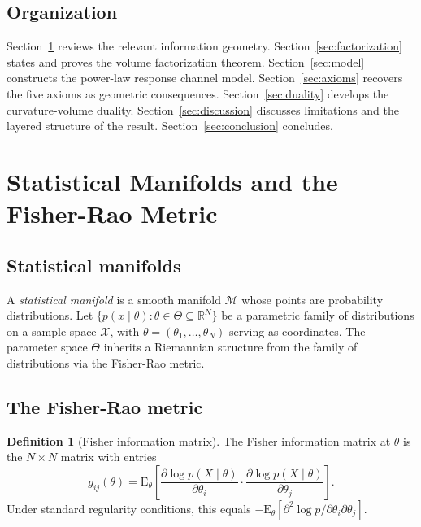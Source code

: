 \documentclass[12pt, a4paper]{article}
\newcommand{\R}{\mathbb{R}}
\theoremstyle{definition}
\newtheorem{definition}[theorem]{Definition}
\theoremstyle{remark}
\begin{document}
\subsection{Organization}

Section~\ref{sec:geometry} reviews the relevant information geometry. Section~\ref{sec:factorization} states and proves the volume factorization theorem. Section~\ref{sec:model} constructs the power-law response channel model. Section~\ref{sec:axioms} recovers the five axioms as geometric consequences. Section~\ref{sec:duality} develops the curvature-volume duality. Section~\ref{sec:discussion} discusses limitations and the layered structure of the result. Section~\ref{sec:conclusion} concludes.

\section{Statistical Manifolds and the Fisher-Rao Metric}\label{sec:geometry}

\subsection{Statistical manifolds}

A \textit{statistical manifold} is a smooth manifold $\mathcal{M}$ whose points are probability distributions. Let $\{p(x \mid \theta) : \theta \in \Theta \subseteq \R^N\}$ be a parametric family of distributions on a sample space $\mathcal{X}$, with $\theta = (\theta_1, \ldots, \theta_N)$ serving as coordinates. The parameter space $\Theta$ inherits a Riemannian structure from the family of distributions via the Fisher-Rao metric.

\subsection{The Fisher-Rao metric}

\begin{definition}[Fisher information matrix]
The Fisher information matrix at $\theta$ is the $N \times N$ matrix with entries
\begin{equation}\label{eq:fisher}
g_{ij}(\theta) = \mathrm{E}_\theta\!\left[\frac{\partial \log p(X \mid \theta)}{\partial \theta_i} \cdot \frac{\partial \log p(X \mid \theta)}{\partial \theta_j}\right].
\end{equation}
Under standard regularity conditions, this equals $-\mathrm{E}_\theta[\partial^2 \log p / \partial \theta_i \partial \theta_j]$.
\end{definition}
\end{document}
